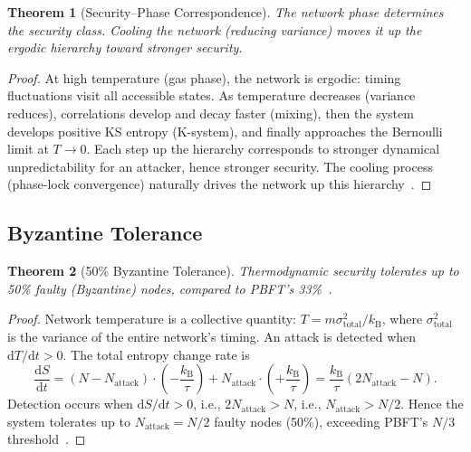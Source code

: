 \documentclass[11pt,twocolumn,a4paper]{article}
\newtheorem{theorem}{Theorem}[section]
\theoremstyle{definition}
\newcommand{\kB}{k_{\mathrm{B}}}
\newcommand{\dif}{\mathrm{d}}
\begin{document}
\begin{theorem}[Security--Phase Correspondence]\label{thm:security_phase}
The network phase determines the security class. Cooling the network (reducing variance)
moves it up the ergodic hierarchy toward stronger security.
\end{theorem}

\begin{proof}
At high temperature (gas phase), the network is ergodic: timing fluctuations visit all
accessible states. As temperature decreases (variance reduces), correlations develop and
decay faster (mixing), then the system develops positive KS entropy (K-system), and
finally approaches the Bernoulli limit at $T \to 0$. Each step up the hierarchy
corresponds to stronger dynamical unpredictability for an attacker, hence stronger
security. The cooling process (phase-lock convergence) naturally drives the network up
this hierarchy~\cite{sachikonye2025a,pathria2011}.
\end{proof}

\subsection{Byzantine Tolerance}\label{sec:security:byzantine}

\begin{theorem}[50\% Byzantine Tolerance]\label{thm:byzantine}
Thermodynamic security tolerates up to 50\% faulty (Byzantine) nodes, compared to
PBFT's 33\%~\cite{castro1999}.
\end{theorem}

\begin{proof}
Network temperature is a collective quantity: $T = m\sigma^2_{\mathrm{total}}/\kB$, where
$\sigma^2_{\mathrm{total}}$ is the variance of the entire network's timing. An attack is
detected when $\dif T/\dif t > 0$. The total entropy change rate is
\begin{equation}\label{eq:byzantine_entropy}
  \frac{\dif S}{\dif t} = (N - N_{\mathrm{attack}}) \cdot \left(-\frac{\kB}{\tau}\right)
  + N_{\mathrm{attack}} \cdot \left(+\frac{\kB}{\tau}\right)
  = \frac{\kB}{\tau}(2N_{\mathrm{attack}} - N).
\end{equation}
Detection occurs when $\dif S/\dif t > 0$, i.e., $2N_{\mathrm{attack}} > N$, i.e.,
$N_{\mathrm{attack}} > N/2$. Hence the system tolerates up to $N_{\mathrm{attack}} = N/2$
faulty nodes (50\%), exceeding PBFT's $N/3$ threshold~\cite{castro1999}.
\end{proof}
\end{document}
